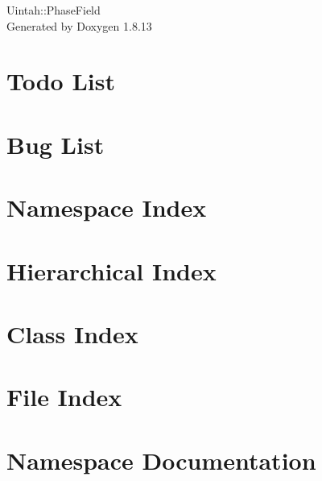 \documentclass[twoside]{book}
\newcommand{\+}{\discretionary{\mbox{\scriptsize$\hookleftarrow$}}{}{}}
\newcommand{\clearemptydoublepage}{%
  \newpage{\pagestyle{empty}\cleardoublepage}%
}
\begin{document}
\hypersetup{pageanchor=false,
             bookmarksnumbered=true,
             pdfencoding=unicode
            }
\begin{titlepage}
\vspace*{7cm}
\begin{center}%
{\Large Uintah\+:\+:Phase\+Field }\\
\vspace*{1cm}
{\large Generated by Doxygen 1.8.13}\\
\end{center}
\end{titlepage}
\clearemptydoublepage
{}
\tableofcontents
\clearemptydoublepage
{}
\hypersetup{pageanchor=true}

\chapter{Todo List}
\label{todo}

\chapter{Bug List}
\label{bug}

\chapter{Namespace Index}

\chapter{Hierarchical Index}

\chapter{Class Index}

\chapter{File Index}

\chapter{Namespace Documentation}



\end{document}
